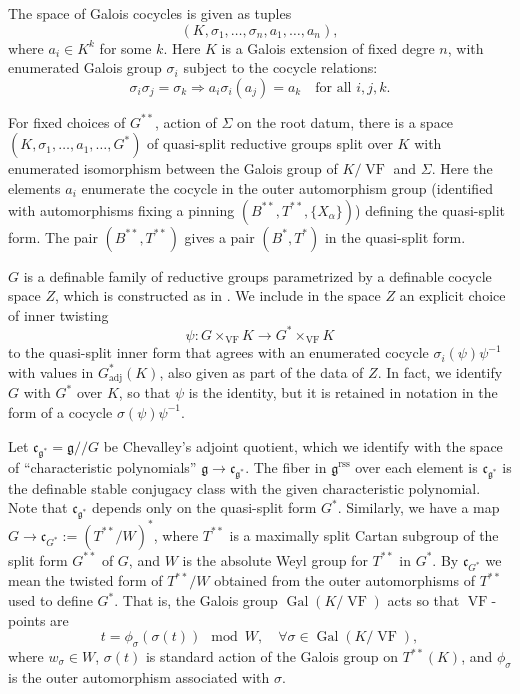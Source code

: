 \documentclass[12pt]{amsart}
\newcommand{\op}[1]{\operatorname{#1}}
\def\VF{{\op{VF}}}
\newcommand{\fg}{\mathfrak{g}}
\newcommand{\fc}{\mathfrak{c}}
\newcommand{\reg}{\mathrm{rss}}
\theoremstyle{plain}
\theoremstyle{definition}
\begin{document}
The space of Galois cocycles is given as tuples
\[
(K,\sigma_1,\ldots,\sigma_n,a_1,\ldots,a_n),
\]
where $a_i \in K^k$ for some $k$.  Here $K$ is a Galois extension of
fixed degre $n$, with enumerated Galois group $\sigma_i$ subject to
the cocycle relations:
\[
\sigma_i \sigma_j 
  = \sigma_k \Longrightarrow a_i \sigma_i(a_j) 
  = a_k\quad\text{for all } i,j,k.
\]

For fixed choices of $G^{**}$, action of $\Sigma$ on the root datum,
there is a space $(K,\sigma_1,\ldots,a_1,\ldots,G^*)$ of
quasi-split reductive groups split over $K$ with enumerated
isomorphism between the Galois group of $K/\VF$ and $\Sigma$.  Here
the elements $a_i$ enumerate the cocycle in the outer
automorphism group (identified with automorphisms fixing a pinning
$(B^{**},T^{**},\{X_\alpha\})$) defining the quasi-split form.  The
pair $(B^{**},T^{**})$ gives a pair $(B^*,T^*)$ in the quasi-split
form.

$G$ is a definable family of reductive groups parametrized by a
definable cocycle space $Z$, which is constructed as in \cite{CGH}.  We
include in the space $Z$ an explicit choice of inner twisting 
\[
\psi:G
\times_\VF K \to G^*\times_\VF K
\] to the quasi-split inner form that agrees with an enumerated
cocycle $\sigma_i(\psi) \psi^{-1}$ with values in $G^*_{\op{adj}}(K)$, also
given as part of the data of $Z$.  In fact, we identify $G$ with $G^*$
over $K$, so that $\psi$ is the identity, but it is retained in
notation in the form of a cocycle $\sigma(\psi)\psi^{-1}$.  

Let $\fc_{\fg^{*}} = \fg/\!/G$ be Chevalley's adjoint quotient, which
we identify with the space of ``characteristic polynomials'' $\fg\to
\fc_{\fg^{*}}$.  The fiber in $\fg^\reg$ over each element is
$\fc_{\fg^{*}}$ is the definable stable conjugacy class with the given
characteristic polynomial.  Note that $\fc_{\fg^{*}}$ depends only on
the quasi-split form $G^*$. Similarly, we have a map $G\to \fc_{G^*}:= (T^{**}/W)^*$,
where $T^{**}$ is a maximally split Cartan subgroup of the split
form $G^{**}$ of $G$, and $W$ is the absolute Weyl group for $T^{**}$
in $G^*$.  By $\fc_{G^*}$ we mean the twisted form of $T^{**}/W$
obtained from the outer automorphisms of $T^{**}$ used to define
$G^*$.  That is, the Galois group $\op{Gal}(K/\VF)$ acts so that
$\VF$-points are
\[
t =  \phi_\sigma(\sigma(t))\mod W, \quad\forall \sigma\in\op{Gal}(K/\VF),
\]
where $w_\sigma\in W$, $\sigma(t)$ is standard action of the Galois
group on $T^{**}(K)$, and $\phi_\sigma$ is the outer automorphism
associated with $\sigma$.
\end{document}
